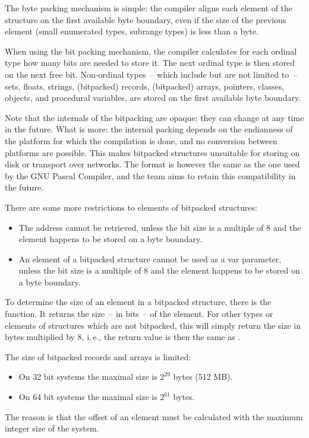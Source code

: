 The byte packing mechanism is simple: the compiler aligns each element of
the structure on the first available byte boundary, even if the size of the
previous element (small enumerated types, subrange types) is less than a
byte.

When using the bit packing mechanism, the compiler calculates for each
ordinal type how many bits are needed to store it. The next ordinal type
is then stored on the next free bit. Non-ordinal types~-- which include but
are not limited to~-- sets, floats, strings, (bitpacked) records, (bitpacked)
arrays, pointers, classes, objects, and procedural variables, are stored
on the first available byte boundary.

Note that the internals of the bitpacking are opaque: they can change
at any time in the future. What is more: the internal packing depends
on the endianness of the platform for which the compilation is done,
and no conversion between platforms are possible. This makes bitpacked
structures unsuitable for storing on disk or transport over networks.
The format is however the same as the one used by the GNU Pascal
Compiler, and the \fpc team aims to retain this compatibility in the future.

There are some more restrictions to elements of bitpacked structures:
\begin{itemize}
\item The address cannot be retrieved, unless the bit size is a multiple of
8 and the element happens to be stored on a byte boundary.
\item An element of a bitpacked structure cannot be used as a var parameter,
unless the bit size is a multiple of 8 and the element happens to be stored
on a byte boundary.
\end{itemize}

To determine the size of an element in a bitpacked structure, there is the
 function. It returns the size~-- in bits~-- of the element.
For other types or elements of structures which are not bitpacked, this will
simply return the size in bytes multiplied by 8, i.\,e., the return value is
then the same as .

The size of bitpacked records and arrays is limited:
\begin{itemize}
\item On 32 bit systems the maximal size is $2^{29}$ bytes (512 MB).
\item On 64 bit systems the maximal size is $2^{61}$ bytes.
\end{itemize}
The reason is that the offset of an element must be calculated with
the maximum integer size of the system.

